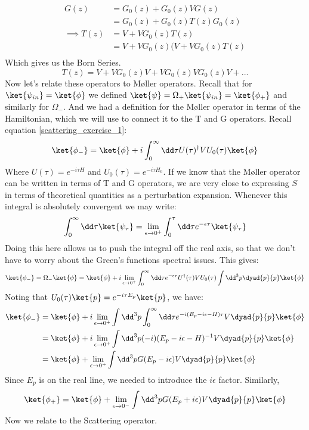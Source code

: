 \documentclass{article}
\begin{document}
\begin{align}
G(z) &= G_0(z)+G_0(z)VG(z)\\
&= G_0(z)+G_0(z)T(z)G_0(z)\\
\implies T(z) &= V+VG_0(z)T(z)\\
&= V+VG_0(z)(V+VG_0(z)T(z)\\\end{align}
Which gives us the Born Series.
\[T(z)= V+VG_0(z)V + VG_0(z)VG_0(z)V + ... \]
Now let's relate these operators to M\o ller operators. Recall that for $\ket{\psi_{in}}=\ket{\phi}$ we defined $\ket{\psi}=\Omega_+ \ket{\psi_{in}} = \ket{\phi_+}$ and similarly for $\Omega_-$. And we had a definition for the M\o ller operator in terms of the Hamiltonian, which we will use to connect it to the T and G operators. Recall equation \eqref{scattering_exercise_1}:
\[\ket{\phi_-} = \ket{\phi}+i\int_0^\infty \dd \tau U(\tau)^\dagger V U_0(\tau)\ket{\phi}\]
Where $U(\tau) = e^{-i\tau H}$ and $U_0(\tau)=e^{-i\tau H_0}$. If we know that the M\o ller operator can be written in terms of T and G operators, we are very close to expressing $S$ in terms of theoretical quantities as a perturbation expansion. Whenever this integral is absolutely convergent we may write:
\[\int_0^\infty \dd \tau \ket{\psi_\tau} = \lim_{\epsilon \to 0^+} \int_0^\tau \dd \tau e^{-\epsilon \tau} \ket{\psi_\tau}\]
Doing this here allows us to push the integral off the real axis, so that we don't have to worry about the Green's functions spectral issues. This gives:
\[\ket{\phi_-} = \Omega_-\ket{\phi} = \ket{\phi} + i\lim_{\epsilon \to 0^+} \int_0^\infty \dd \tau e^{-\epsilon \tau} U^\dagger(\tau)VU_0(\tau)\int \dd^3 p \dyad{p}{p} \ket{\phi}\]
Noting that $U_0(\tau)\ket{p}=e^{-i\tau E_p}\ket{p}$, we have:
\begin{align}\ket{\phi_-} &= \ket{\phi}+i\lim_{\epsilon\to 0^+} \int \dd^3 p \int_0^\infty \dd \tau e^{-i(E_p-i\epsilon - H)\tau}V\dyad{p}{p}\ket{\phi}\\
&= \ket{\phi}+i\lim_{\epsilon \to 0^+} \int\dd^3 p (-i)(E_p-i\epsilon - H)^{-1} V \dyad{p}{p}\ket{\phi}\\
&= \ket{\phi}+\lim_{\epsilon\to0^+}\int \dd^3 p G(E_p-i\epsilon)V\dyad{p}{p}\ket{\phi}
\end{align}
Since $E_p$ is on the real line, we needed to introduce the $i\epsilon$ factor. Similarly,
\begin{equation}\ket{\phi_+} = \ket{\phi}+\lim_{\epsilon \to 0^-}\int \dd^3 p G(E_p+i\epsilon)V\dyad{p}{p}\ket{\phi}\end{equation}
Now we relate to the Scattering operator.
\end{document}
